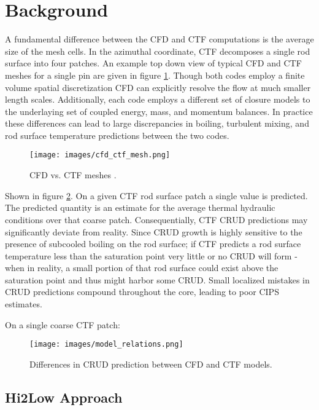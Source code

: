 \section{Background}

A fundamental difference between the CFD and CTF computations is the average size of the mesh cells.  In the azimuthal coordinate, CTF decomposes a single rod surface into four patches.  An example top down view of typical CFD and CTF meshes for a single pin are given in figure \ref{fig:cfd_ctf_mesh}.  Though both codes employ a finite volume spatial discretization CFD can explicitly resolve the flow at much smaller length scales.  Additionally, each code employs a different set of closure models to the underlaying set of coupled energy, mass, and momentum balances.  In practice these differences can lead to large discrepancies in boiling, turbulent mixing, and rod surface temperature predictions between the two codes.

\begin{figure}[!htbp]
\centering
\texttt{[image: images/cfd\_ctf\_mesh.png]}
\caption{CFD vs. CTF meshes \cite{salko12}.}
\label{fig:cfd_ctf_mesh}
\end{figure}

Shown in figure \ref{fig:model_overview}. On a given CTF rod surface patch a single value is predicted.  The predicted quantity is an estimate for the average thermal hydraulic conditions over that coarse patch.  Consequentially, CTF CRUD predictions may significantly deviate from reality.  Since CRUD growth is highly sensitive to the presence of subcooled boiling on the rod surface; if CTF predicts a rod surface temperature less than the saturation point very little or no CRUD will form - when in reality, a small portion of that rod surface could exist above the saturation point and thus might harbor some CRUD.  Small localized mistakes in CRUD predictions compound throughout the core, leading to poor CIPS estimates. 

On a single coarse CTF patch:
\begin{figure}[!htbp]
\centering
\texttt{[image: images/model\_relations.png]}
\caption{Differences in CRUD prediction between CFD and CTF models.}
\label{fig:model_overview}
\end{figure}

\subsection{Hi2Low Approach}

